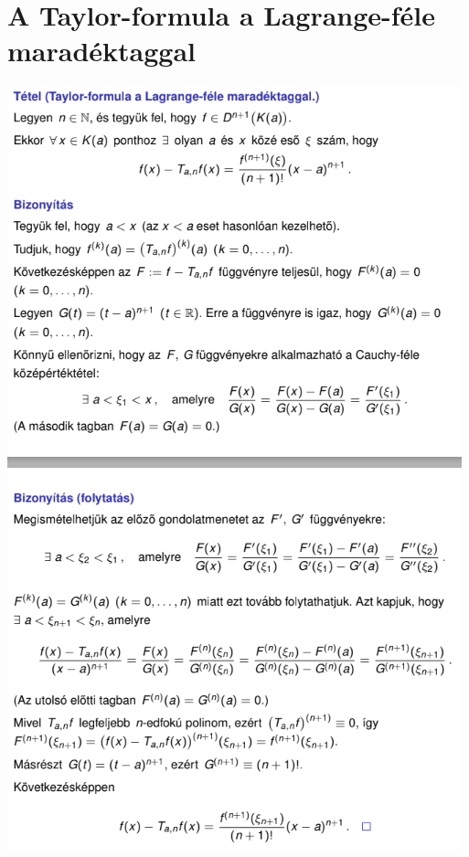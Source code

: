 \documentclass[10pt,a4paper]{article}
\begin{document}
\section{A Taylor-formula a Lagrange-féle maradéktaggal}
\includegraphics[scale=1]{12.PNG}
\end{document}
